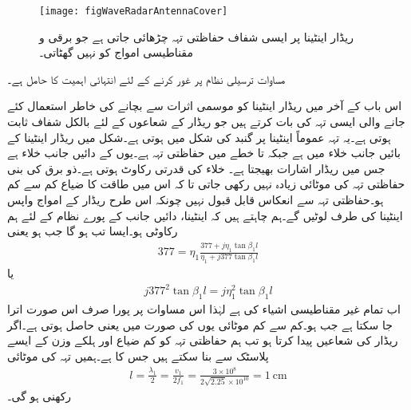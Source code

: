 \begin{figure}
\centering
\texttt{[image: figWaveRadarAntennaCover]}
\caption{ریڈار اینٹینا پر ایسی شفاف حفاظتی تہہ چڑھائی جاتی ہے جو برقی و مقناطیسی امواج کو نہیں گھٹاتی۔}
\label{شکل_موج_ریڈار_اینٹینا_تہہ}
\end{figure}

مساوات  ترسیلی نظام پر غور کرنے کے لئے انتہائی اہمیت کا حامل ہے۔

اس باب کے آخر میں ریڈار اینٹینا کو موسمی اثرات سے بچانے کی خاطر استعمال کئے جانے والی ایسی تہہ کی بات کرتے ہیں جو ریڈار کے شعاعوں کے لئے بالکل شفاف ثابت ہوتی ہے۔یہ تہہ عموماً اینٹینا پر گنبد کی شکل میں ہوتی ہے۔شکل  میں ریڈار اینٹینا  کے بائیں جانب خلاء میں ہے جبکہ  تا  خطے میں حفاظتی تہہ ہے۔یوں  کے دائیں جانب خلاء ہے جس میں ریڈار اشارات بھیجتا ہے۔ خلاء کی قدرتی رکاوٹ  ہوتی ہے۔ذو برق کی بنی حفاظتی تہہ کی موٹائی زیادہ نہیں رکھی جاتی تا کہ اس میں طاقت کا ضیاع کم سے کم ہو۔حفاظتی تہہ سے انعکاس قابل قبول نہیں چونکہ اس طرح ریڈار کے امواج واپس اینٹینا کی طرف لوٹیں گے۔ہم چاہتے ہیں کہ اینٹینا، دائیں جانب کے پورے نظام کے لئے ہم رکاوٹی ہو۔ایسا تب ہو گا جب  ہو یعنی
\begin{align*}
377=\eta_1 \frac{377+j\eta_1 \tan \beta_1 l}{\eta_1+j 377 \tan \beta_1 l}
\end{align*}
یا
\begin{align*}
j 377^2 \tan \beta_1 l =j \eta_1^2 \tan \beta_1 l
\end{align*}
اب تمام غیر مقناطیسی اشیاء کی  ہے لہٰذا اس مساوات پر پورا صرف اس صورت اترا جا سکتا ہے جب  ہو۔کم سے کم موٹائی یوں  کی صورت میں  یعنی  حاصل ہوتی ہے۔اگر ریڈار  کی شعاعیں پیدا کرتا ہو تب ہم حفاظتی تہہ کو کم ضیاع اور ہلکے وزن کے ایسے  پلاسٹک  سے بنا سکتے ہیں جس کا  ہے۔ہمیں تہہ کی موٹائی
\begin{align*}
l=\frac{\lambda_1}{2}=\frac{v_1}{2 f_1}=\frac{3\times 10^8}{2 \sqrt{2.25} \times 10^{10}}=\SI{1}{\centi\meter}
\end{align*}
رکھنی ہو گی۔

